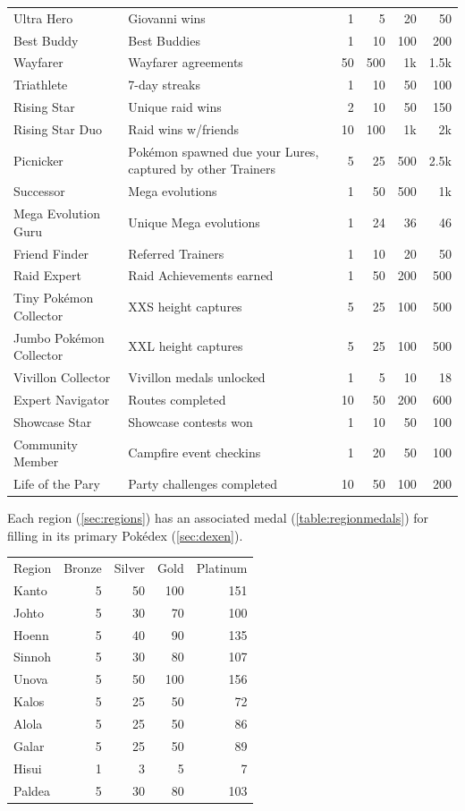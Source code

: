 \begin{table}[ht]
\begin{tabular}{lp{}rrrr}
  Ultra Hero & Giovanni wins & 1 & 5 & 20 & 50\\
  Best Buddy & Best Buddies & 1 & 10 & 100 & 200\\
  Wayfarer & Wayfarer agreements & 50 & 500 & 1k & 1.5k\\
  Triathlete & 7-day streaks & 1 & 10 & 50 & 100\\
  Rising Star & Unique raid wins & 2 & 10 & 50 & 150\\
  Rising Star Duo & Raid wins w/friends & 10 & 100 & 1k & 2k\\
  Picnicker & Pokémon spawned due your Lures, captured by other Trainers & 5 & 25 & 500 & 2.5k\\
  Successor & Mega evolutions & 1 & 50 & 500 & 1k\\
  Mega Evolution Guru & Unique Mega evolutions & 1 & 24 & 36 & 46\\
  Friend Finder & Referred Trainers & 1 & 10 & 20 & 50\\
  Raid Expert & Raid Achievements earned & 1 & 50 & 200 & 500\\
  Tiny Pokémon Collector & XXS height captures & 5 & 25 & 100 & 500\\
  Jumbo Pokémon Collector & XXL height captures & 5 & 25 & 100 & 500\\
  Vivillon Collector & Vivillon medals unlocked & 1 & 5 & 10 & 18\\
  Expert Navigator & Routes completed & 10 & 50 & 200 & 600\\
  Showcase Star & Showcase contests won & 1 & 10 & 50 & 100\\
  Community Member & Campfire event checkins & 1 & 20 & 50 & 100\\
  Life of the Pary & Party challenges completed & 10 & 50 & 100 & 200\\
\end{tabular}
\end{table}
Each region (\autoref{sec:regions}) has an associated medal (\autoref{table:regionmedals}) for filling
  in its primary Pokédex (\autoref{sec:dexen}).
\begin{table}[hb]
\centering
\begin{tabular}{lrrrr}
  Region & Bronze & Silver & Gold & Platinum\\
  \Midrule
  Kanto & 5 & 50 & 100 & 151\\
  Johto & 5 & 30 & 70 & 100\\
  Hoenn & 5 & 40 & 90 & 135\\
  Sinnoh & 5 & 30 & 80 & 107\\
  Unova & 5 & 50 & 100 & 156\\
  Kalos & 5 & 25 & 50 & 72\\
  Alola & 5 & 25 & 50 & 86\\
  Galar & 5 & 25 & 50 & 89\\
  Hisui & 1 & 3 & 5 & 7\\
  Paldea & 5 & 30 & 80 & 103\\
\end{tabular}
\end{table}
